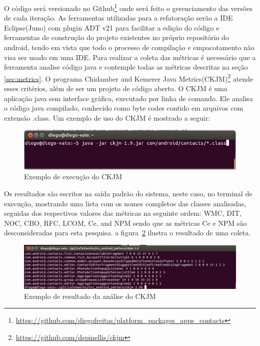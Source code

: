 \documentclass[conference]{IEEEtran}
\begin{document}
O código será versionado no
Github\footnote{\url{https://github.com/diegofreitas/platform_packages_apps_contacts}}
onde será feito o gerenciamento das versões de cada iteração.
As ferramentas utilizadas para a refatoração serão a IDE Eclipse(Juno) com
plugin ADT v21 para facilitar a edição do código e ferramentas de construção
do projeto existentes no próprio repositório do android, tendo em vista que todo
o processo de compilação e empacotamento não visa ser usado em uma IDE.
Para realizar a coleta das métricas é necessário que a ferramenta analise código
java e contemple todas as métricas descritas na seção \ref{sec:metrics}. O
programa Chidamber and Kemerer Java
Metrics(CKJM)\footnote{\url{https://github.com/dspinellis/ckjm}} atende esses
critérios, além de ser um projeto de código aberto. O CKJM é uma aplicação java
sem interface gráfica, executado por linha de comando. Ele analisa o código java
compilado, conhecido como byte codes contido em arquivos com extensão .class. Um
exemplo de uso do CKJM é mostrado a seguir:

\begin{figure}[htb]
	\begin{center}
		\includegraphics[scale=0.30]{img/ckjm_run.png}
	\end{center}
	\caption{\label{fig:ckjm_run} Exemplo de execução do CKJM} 
	
\end{figure}

Os resultados são escritos na saída padrão do sistema, neste caso, no terminal
de execução, mostrando uma lista com os nomes completos das classes
analisadas, seguidas dos respectivos valores das métricas na seguinte
ordem: WMC, DIT, NOC, CBO, RFC, LCOM, Ce, and NPM sendo que as métricas Ce e
NPM são desconsideradas para esta pesquisa. a figura~\ref{fig:ckjm_result}
ilustra o resultado de uma coleta.

\begin{figure}[htb]
	\begin{center}
		\includegraphics[scale=0.25]{img/ckjm_result.png}
	\end{center}
	\caption{\label{fig:ckjm_result} Exemplo de resultado da análise do CKJM} 
	
\end{figure}
\end{document}
